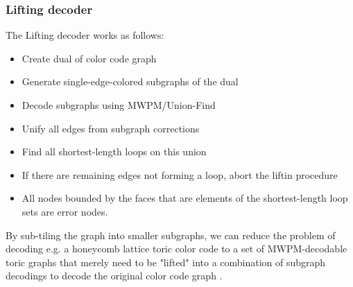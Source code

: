 \subsubsection{Lifting decoder}\label{sec: lifting}
The Lifting decoder works as follows:
\begin{itemize}
    \item Create dual of color code graph
    \item Generate single-edge-colored subgraphs of the dual
    \item Decode subgraphs using MWPM/Union-Find
    \item Unify all edges from subgraph corrections
    \item Find all shortest-length loops on this union
    \item If there are remaining edges not forming a loop, abort the liftin procedure
    \item All nodes bounded by the faces that are elements of the shortest-length loop sets
    are error nodes. 
\end{itemize}
By sub-tiling
the graph into smaller subgraphs, we can reduce the problem of decoding
e.g. a honeycomb lattice toric color code to a set of
MWPM-decodable toric graphs that merely need to be "lifted" into a 
combination of subgraph decodings to decode the original color code
graph \cite{delfosse}. 
